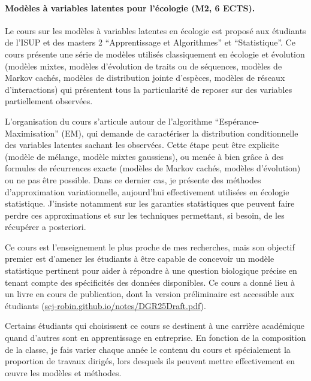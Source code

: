 \paragraph{Modèles à variables latentes pour l'écologie (M2, 6 ECTS).}
Le cours sur les modèles à variables latentes en écologie est proposé aux étudiants de l’ISUP et des masters 2 “Apprentissage et Algorithmes” et “Statistique”. Ce cours présente une série de modèles utilisés classiquement en écologie et évolution (modèles mixtes, modèles d’évolution de traits ou de séquences, modèles de Markov cachés, modèles de distribution jointe d’espèces, modèles de réseaux d’interactions) qui présentent tous la particularité de reposer sur des variables partiellement observées.

L’organisation du cours s’articule autour de l’algorithme “Espérance-Maximisation” (EM), qui demande de caractériser la distribution conditionnelle des variables latentes sachant les observées. Cette étape peut être explicite (modèle de mélange, modèle mixtes gaussiens), ou menée à bien grâce à des formules de récurrences exacte (modèles de Markov cachés, modèles d’évolution) ou ne pas être possible. Dans ce dernier cas, je présente des méthodes d’approximation variationnelle, aujourd’hui effectivement utilisées en écologie statistique. J’insiste notamment sur les garanties statistiques que peuvent faire perdre ces approximations et sur les techniques permettant, si besoin, de les récupérer a posteriori.

Ce cours est l’enseignement le plus proche de mes recherches, mais son objectif premier est d’amener les étudiants à être capable de concevoir un modèle statistique pertinent pour aider à répondre à une question biologique précise en tenant compte des spécificités des données disponibles. Ce cours a donné lieu à un livre en cours de publication, dont la version préliminaire est accessible aux étudiants (\url{scj-robin.github.io/notes/DGR25Draft.pdf}).

Certains étudiants qui choisissent ce cours se destinent à une carrière académique quand d’autres sont en apprentissage en entreprise. En fonction de la composition de la classe, je fais varier chaque année le contenu du cours et spécialement la proportion de travaux dirigés, lors desquels ils peuvent mettre effectivement en œuvre les modèles et méthodes.


